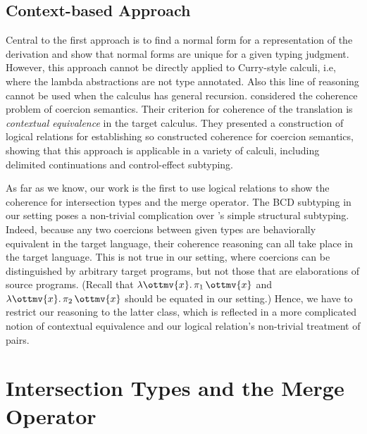 \subsection{Context-based Approach}

Central to the first approach is to find a normal form for a representation of
the derivation and show that normal forms are unique for a given typing
judgment. However, this approach cannot be directly applied to Curry-style
calculi, i.e, where the lambda abstractions are not type annotated. Also this
line of reasoning cannot be used when the calculus has general recursion.
\citet{biernacki2015logical} considered the coherence problem of coercion
semantics. Their criterion for coherence of the translation is
\textit{contextual equivalence} in the target calculus. They presented a
construction of logical relations for establishing so constructed coherence for
coercion semantics, showing that this approach is applicable in a variety of
calculi, including delimited continuations and control-effect subtyping.

As far as we know, our work is the first to use logical relations to show the
coherence for intersection types and the merge operator. The BCD subtyping in
our setting poses a non-trivial complication over
\citeauthor{biernacki2015logical}'s simple structural subtyping. Indeed, because
any two coercions between given types are behaviorally equivalent in the target
language, their coherence reasoning can all take place in the target language.
This is not true in our setting, where coercions can be distinguished by
arbitrary target programs, but not those that are elaborations of source
programs. (Recall that $ \lambda \ottmv{x} .\, \pi_1 \, \ottmv{x} $ and $ \lambda \ottmv{x} .\, \pi_2 \, \ottmv{x} $ should be equated in our setting.)
Hence, we have to restrict our reasoning to the latter class, which is reflected
in a more complicated notion of contextual equivalence and our logical
relation's non-trivial treatment of pairs.

\section{Intersection Types and the Merge Operator}

